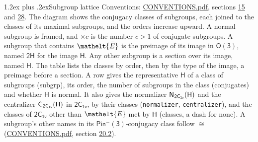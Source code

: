 \documentclass[10pt,a4paper]{article}
\makeatletter
\renewcommand\section{\@startsection{section}{1}{\z@}{-3ex plus -1ex minus -.2ex}%
  {1.2ex plus .2ex}{\normalfont\large\sffamily\bfseries\color{parttitle}}}
\numberwithin{equation}{section}
\newcommand{\eltfont}[1]{{\let\sigma\eltsigma\mathelt{#1}}}
\newcommand{\grp}[1]{\mathsf{#1}}
\newcommand{\cls}[1]{\eltfont{#1}}
\newcommand{\elt}[1]{\eltfont{#1}}
\newcommand{\samecls}{\cong}
\newcommand{\barred}[1]{\bar{#1}}
\newcommand{\hairsp}{\mkern1mu}
\makeatother
\begin{document}
\section{Subgroup lattice}\label{s:subgroups}
Conventions: \href{../../CONVENTIONS.pdf}{CONVENTIONS.pdf}, sections \href{../../../rotation/CONVENTIONS.pdf\#conv.15}{15} and \href{../../CONVENTIONS.pdf\#conv.28}{28}.
The diagram shows the conjugacy classes of subgroups, each joined to the classes of its maximal subgroups, and the orders increase upward. \label{n:index.conjugates.c}A normal subgroup is framed, and ${\times}c$ is the number $c > 1$ of conjugate subgroups. \label{n:group.H}A subgroup that contains $\elt{\barred{E}}$ is the preimage of its image in $\grp{O(3)}$, named $\grp{2H}$ for the image $\grp{H}$. Any other subgroup is a section over its image, named $\grp{H}$. The table lists the classes by order, then by the type of the image, a preimage before a section. \label{n:head.subgroup}\label{n:head.order}\label{n:head.conjugates}\label{n:head.normal}A row gives the representative $\grp{H}$ of a class of subgroups (subgrp), its order, the number of subgroups in the class (conjugates) and whether $\grp{H}$ is normal. \label{n:group.normalizer}\label{n:group.centralizer}\label{n:head.classes}It also gives the normalizer $\grp{N}_{\hairsp \grp{2C_{1v}}}(\grp{H})$ and the centralizer $\grp{C}_{\hairsp \grp{2C_{1v}}}(\grp{H})$ in $\grp{2C_{1v}}$, by their classes (\texttt{normalizer}, \texttt{centralizer}), and the classes of $\grp{2C_{1v}}$ other than $\cls{E}$ met by $\grp{H}$ (classes, a dash for none). A subgroup's other names in its \href{Pinminus3.pdf}{$\grp{Pin^{-}(3)}$}-conjugacy class follow $\samecls$ (\href{../../CONVENTIONS.pdf}{CONVENTIONS.pdf}, section \href{../../CONVENTIONS.pdf\#conv.20.2}{20.2}).
\begin{center}
\end{center}
\end{document}
